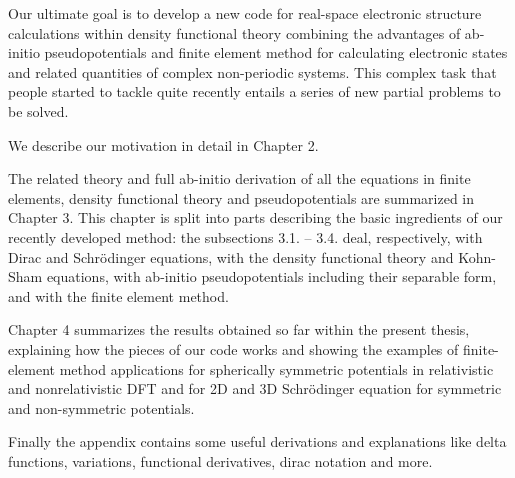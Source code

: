 Our ultimate goal is to develop a new code for real-space electronic structure
calculations within density functional theory combining the advantages
of ab-initio pseudopotentials and finite element method for calculating
electronic states and related quantities of complex non-periodic systems.
This complex task that people started to tackle quite recently
\cite{pask1, pask2, ortiz1, ortiz2}
entails a series of new partial problems to be solved.

We describe our motivation in detail in Chapter 2.

The related theory and full ab-initio derivation of all the equations
in finite elements, density functional theory and pseudopotentials
are summarized in Chapter 3.
This chapter is split into parts describing the basic ingredients of our
recently developed method: the subsections 3.1. -- 3.4. deal, respectively,
with Dirac and Schr\"odinger equations, with the density functional theory and
Kohn-Sham equations, with ab-initio pseudopotentials including their separable
form, and with the finite element method.


Chapter 4 summarizes the results obtained so far within the
present thesis, explaining how the pieces of our code works and showing
the examples of finite-element method applications for spherically symmetric
potentials in relativistic and nonrelativistic DFT and for 2D and 3D
Schr\"odinger equation for symmetric and non-symmetric potentials.

Finally the appendix contains some useful derivations and explanations like
delta functions, variations, functional derivatives, dirac notation and more.
